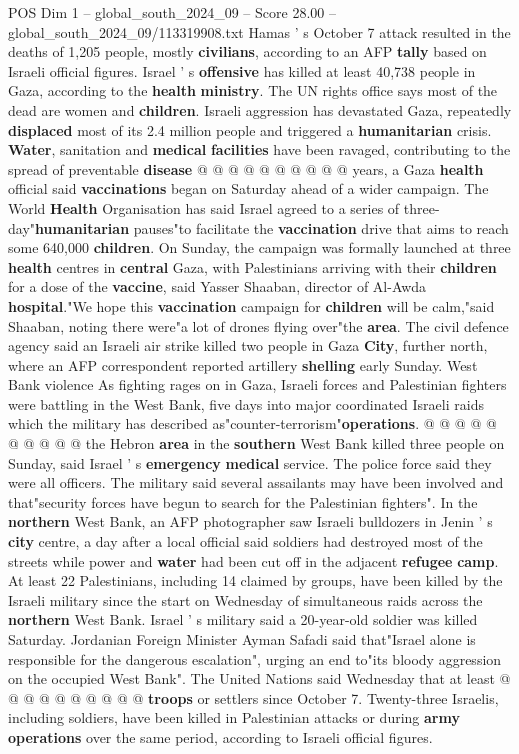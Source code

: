 \begin{textsample}{POS Dim 1 – global\_south\_2024\_09 – Score 28.00 – global\_south\_2024\_09/113319908.txt}
Hamas ' s October 7 attack resulted in the deaths of 1,205 people, mostly \textbf{civilians}, according to an AFP \textbf{tally} based on Israeli official figures.
Israel ' s \textbf{offensive} has killed at least 40,738 people in Gaza, according to the \textbf{health} \textbf{ministry}.
The UN rights office says most of the dead are women and \textbf{children}.
Israeli aggression has devastated Gaza, repeatedly \textbf{displaced} most of its 2.4 million people and triggered a \textbf{humanitarian} crisis. \textbf{Water}, sanitation and \textbf{medical} \textbf{facilities} have been ravaged, contributing to the spread of preventable \textbf{disease} @ @ @ @ @ @ @ @ @ @ years, a Gaza \textbf{health} official said \textbf{vaccinations} began on Saturday ahead of a wider campaign.
The World \textbf{Health} Organisation has said Israel agreed to a series of three-day"\textbf{humanitarian} pauses"to facilitate the \textbf{vaccination} drive that aims to reach some 640,000 \textbf{children}.
On Sunday, the campaign was formally launched at three \textbf{health} centres in \textbf{central} Gaza, with Palestinians arriving with their \textbf{children} for a dose of the \textbf{vaccine}, said Yasser Shaaban, director of Al-Awda \textbf{hospital}."We hope this \textbf{vaccination} campaign for \textbf{children} will be calm,"said Shaaban, noting there were"a lot of drones flying over"the \textbf{area}.
The civil defence agency said an Israeli air strike killed two people in Gaza \textbf{City}, further north, where an AFP correspondent reported artillery \textbf{shelling} early Sunday.
West Bank violence As fighting rages on in Gaza, Israeli forces and Palestinian fighters were battling in the West Bank, five days into major coordinated Israeli raids which the military has described as"counter-terrorism"\textbf{operations}. @ @ @ @ @ @ @ @ @ @ the Hebron \textbf{area} in the \textbf{southern} West Bank killed three people on Sunday, said Israel ' s \textbf{emergency} \textbf{medical} service.
The police force said they were all officers.
The military said several assailants may have been involved and that"security forces have begun to search for the Palestinian fighters".
In the \textbf{northern} West Bank, an AFP photographer saw Israeli bulldozers in Jenin ' s \textbf{city} centre, a day after a local official said soldiers had destroyed most of the streets while power and \textbf{water} had been cut off in the adjacent \textbf{refugee} \textbf{camp}.
At least 22 Palestinians, including 14 claimed by groups, have been killed by the Israeli military since the start on Wednesday of simultaneous raids across the \textbf{northern} West Bank.
Israel ' s military said a 20-year-old soldier was killed Saturday.
Jordanian Foreign Minister Ayman Safadi said that"Israel alone is responsible for the dangerous escalation", urging an end to"its bloody aggression on the occupied West Bank".
The United Nations said Wednesday that at least @ @ @ @ @ @ @ @ @ @ \textbf{troops} or settlers since October 7.
Twenty-three Israelis, including soldiers, have been killed in Palestinian attacks or during \textbf{army} \textbf{operations} over the same period, according to Israeli official figures.


\end{textsample}
